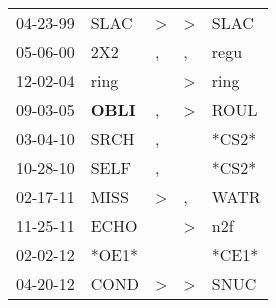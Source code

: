 \begin{supertabular}{p{0.07\textwidth}p{0.06\textwidth}p{0.02\textwidth}p{0.02\textwidth}p{0.06\textwidth}}
 04-23-99\textsuperscript{} &           SLAC\textsuperscript{} &  \textgreater &  \textgreater &  SLAC\textsuperscript{} \\
 05-06-00\textsuperscript{} &            2X2\textsuperscript{} &             , &             , &  regu\textsuperscript{} \\
 12-02-04\textsuperscript{} &           ring\textsuperscript{} &               &  \textgreater &  ring\textsuperscript{} \\
 09-03-05\textsuperscript{} &  \textbf{OBLI\textsuperscript{}} &             , &  \textgreater &  ROUL\textsuperscript{} \\
 03-04-10\textsuperscript{} &           SRCH\textsuperscript{} &             , &               &                   *CS2* \\
 10-28-10\textsuperscript{} &           SELF\textsuperscript{} &             , &               &                   *CS2* \\
 02-17-11\textsuperscript{} &           MISS\textsuperscript{} &  \textgreater &             , &  WATR\textsuperscript{} \\
 11-25-11\textsuperscript{} &           ECHO\textsuperscript{} &               &  \textgreater &   n2f\textsuperscript{} \\
 02-02-12\textsuperscript{} &                            *OE1* &               &               &                   *CE1* \\
 04-20-12\textsuperscript{} &           COND\textsuperscript{} &  \textgreater &  \textgreater &  SNUC\textsuperscript{} \\
\end{supertabular}
